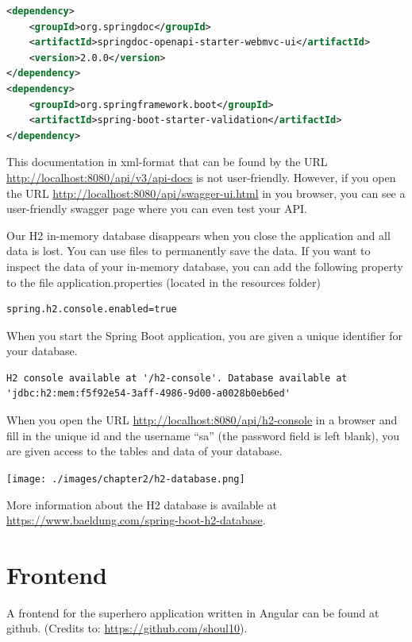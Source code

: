 \documentclass[a4paper, 12pt]{report}
\begin{document}
\begin{lstlisting}[language=xml]
<dependency>
	<groupId>org.springdoc</groupId>
	<artifactId>springdoc-openapi-starter-webmvc-ui</artifactId>
	<version>2.0.0</version>
</dependency>
<dependency>
	<groupId>org.springframework.boot</groupId>
	<artifactId>spring-boot-starter-validation</artifactId>
</dependency>
\end{lstlisting}

This documentation in xml-format that can be found by the URL \url{http://localhost:8080/api/v3/api-docs} is not user-friendly.  However, if you open the URL \url{http://localhost:8080/api/swagger-ui.html} in you browser, you can see a user-friendly swagger page where you can even test your API.


\begin{tcolorbox}[colback=blue!5!white,colframe=blue!75!black,title=H2 database]
Our H2 in-memory database disappears when you close the application and all data is lost.
You can use files to permanently save the data.  If you want to inspect the data of your in-memory database, you can add the following property to the file application.properties (located in the resources folder)
\begin{lstlisting}[frame=single]
spring.h2.console.enabled=true
\end{lstlisting}
When you start the Spring Boot application, you are given a unique identifier for your database.  
\begin{lstlisting}[frame=single]
H2 console available at '/h2-console'. Database available at 'jdbc:h2:mem:f5f92e54-3aff-4986-9d00-a0028b0eb6ed'
\end{lstlisting}
When you open the URL \url{http://localhost:8080/api/h2-console} in a browser and fill in the unique id and the username ``sa'' (the password field is left blank),  you are given access to the tables and data of your database. 

\texttt{[image: ./images/chapter2/h2-database.png]} 

More information about the H2 database is available at \url{https://www.baeldung.com/spring-boot-h2-database}.
\end{tcolorbox}

\section{Frontend}

A frontend for the superhero application written in Angular can be found at github.  (Credits to: \url{https://github.com/shoul10}).
\end{document}

